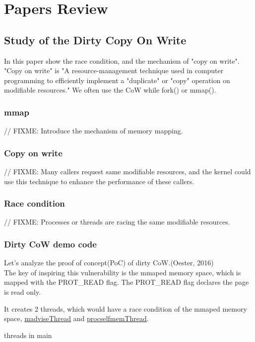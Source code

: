 \documentclass[12pt,a4paper,oneside,draft]{IEEEconf}
\begin{document}
\section{Papers Review}
\subsection{Study of the Dirty Copy On Write\cite{Study_Dirty_Cow}}
In this paper show the race condition, and the mechanism of "copy on write".
"Copy on write" is "A resource-management technique used in computer programming to
efficiently implement a "duplicate" or "copy" operation on modifiable resources."
\cite{CoW_wiki} We often use the CoW while fork() or mmap().

\subsubsection{mmap}
// FIXME: Introduce the mechanism of memory mapping.

\subsubsection{Copy on write}
// FIXME: Many callers request same modifiable resources, and the kernel could use this
technique to enhance the performance of these callers.

\subsubsection{Race condition}
// FIXME: Processes or threads are racing the same modifiable resources.


\subsubsection{\hypertarget{dirty cow}{Dirty CoW} demo code\cite{Dirty_CoW}}
Let's analyze the proof of concept(PoC) of dirty CoW.(Oester, 2016)\\
The key of inspiring this vulnerability is the mmaped memory space, which is mapped with
the PROT\_READ flag. The PROT\_READ flag declares the page is read only.


It creates 2 threads, which would have a race condition of the mmaped memory space,
\hyperlink{madvise}{madviseThread} and \hyperlink{procself}{procselfmemThread}.

\hypertarget{threads_main}{threads in main}

\end{document}
